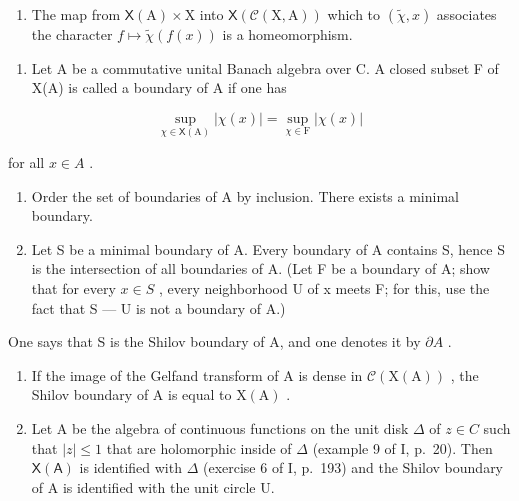 \begin{enumerate}
\def\labelenumi{\alph{enumi})}
\setcounter{enumi}{4}
\tightlist
\item
  The map from \(\mathsf{X}(\mathrm{A})\times \mathrm{X}\) into \(\mathsf{X}(\mathcal{C}(\mathrm{X},\mathrm{A}))\) which to \((\widetilde{\chi},x)\) associates the character \(f\mapsto \widetilde{\chi} (f(x))\) is a homeomorphism.
\end{enumerate}

\begin{enumerate}
\def\labelenumi{\arabic{enumi})}
\setcounter{enumi}{26}
\tightlist
\item
  Let A be a commutative unital Banach algebra over C. A closed subset F of X(A) is called a boundary of A if one has
\end{enumerate}

\[
\sup _ {\chi \in \mathsf {X} (\mathrm{A})} | \chi (x) | = \sup _ {\chi \in \mathrm{F}} | \chi (x) |
\]

for all \(x \in A\) .

\begin{enumerate}
\def\labelenumi{\alph{enumi})}
\item
  Order the set of boundaries of A by inclusion. There exists a minimal boundary.
\item
  Let S be a minimal boundary of A. Every boundary of A contains S, hence S is the intersection of all boundaries of A. (Let F be a boundary of A; show that for every \(x \in S\) , every neighborhood U of x meets F; for this, use the fact that S --- U is not a boundary of A.)
\end{enumerate}

One says that S is the Shilov boundary of A, and one denotes it by \(\partial A\) .

\begin{enumerate}
\def\labelenumi{\alph{enumi})}
\setcounter{enumi}{2}
\item
  If the image of the Gelfand transform of A is dense in \(\mathcal{C}(\mathrm{X}(\mathrm{A}))\) , the Shilov boundary of A is equal to \(\mathrm{X}(\mathrm{A})\) .
\item
  Let A be the algebra of continuous functions on the unit disk \(\Delta\) of \(z \in C\) such that \(|z| \leqslant 1\) that are holomorphic inside of \(\Delta\) (example 9 of I, p.~20). Then \(\mathsf{X}(\mathsf{A})\) is identified with \(\Delta\) (exercise 6 of I, p.~193) and the Shilov boundary of A is identified with the unit circle U.
\end{enumerate}

